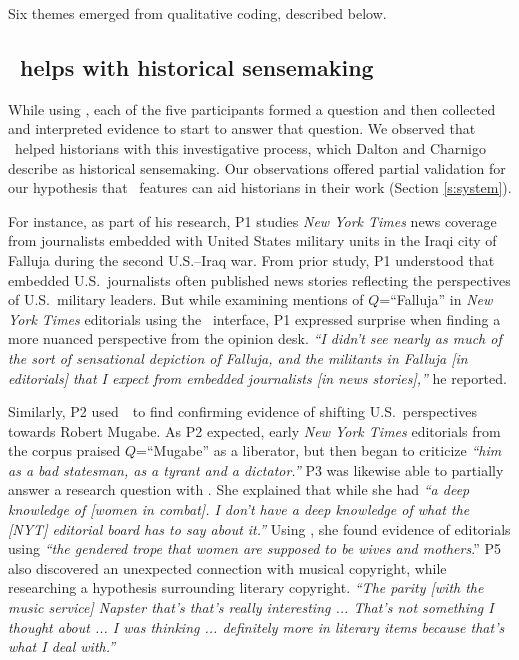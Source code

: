 Six themes emerged from qualitative coding, described below.

\subsection{\ours~helps with historical sensemaking}\label{s:sensemaking}

While using \ours, each of the five participants formed a question and then collected and interpreted evidence to start to answer that question.
We observed that \ours~helped historians with this investigative process, which Dalton and Charnigo \cite{DaltonCharnigo} describe as historical sensemaking. 
Our observations offered partial validation for our hypothesis that \ours~features can aid historians in their work (Section \ref{s:system}).

For instance, as part of his research, P1 studies \textit{New York Times} news coverage from journalists embedded with United States military units in the Iraqi city of Falluja during the second U.S.--Iraq war. 
From prior study, P1 understood that embedded U.S.\ journalists often published news stories reflecting the perspectives of U.S.\ military leaders. 
But while examining mentions of $Q$=``Falluja'' in \textit{New York Times} editorials using the \ours~interface, P1 expressed surprise when finding a more nuanced perspective from the opinion desk.  \textit{``I didn't see nearly as much of the sort of sensational depiction of Falluja, and the militants in Falluja [in editorials] that I expect from embedded journalists [in news stories],''} he reported. 

Similarly, P2 used~\ours~to find confirming evidence of shifting U.S.\ perspectives towards Robert Mugabe.
As P2 expected, early \textit{New York Times} editorials from the corpus praised $Q$=``Mugabe'' as a liberator, but then began to criticize \textit{``him as a bad statesman, as a tyrant and a dictator.''} 
P3 was likewise able to partially answer a research question with \ours.
She explained that while she had \textit{``a deep knowledge of [women in combat]. I don't have a deep knowledge of what the [NYT] editorial board has to say about it.''} 
Using \ours, she found evidence of editorials using \textit{``the gendered trope that women are supposed to be wives and mothers}.''
P5 also discovered an unexpected connection with musical copyright, while researching a hypothesis surrounding literary copyright. 
\textit{``The parity [with the music service] Napster that's that's really interesting ... That's not something I thought about ... I was thinking ... definitely more in literary items because that's what I deal with.''}

